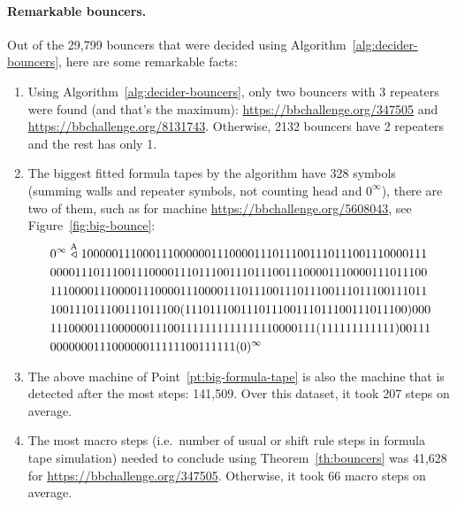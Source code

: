 \paragraph*{Remarkable bouncers.} Out of the 29,799 bouncers that were decided using Algorithm~\ref{alg:decider-bouncers}, here are some remarkable facts:
\begin{enumerate}
    \item Using Algorithm~\ref{alg:decider-bouncers}, only two bouncers with 3 repeaters were found (and that's the maximum): \url{https://bbchallenge.org/347505} and \url{https://bbchallenge.org/8131743}. Otherwise, 2132 bouncers have 2 repeaters and the rest has only 1.
    \item\label{pt:big-formula-tape} The biggest fitted formula tapes by the algorithm have 328 symbols (summing walls and repeater symbols, not counting head and $0^\infty$), there are two of them, such as for machine \url{https://bbchallenge.org/5608043}, see Figure~\ref{fig:big-bounce}:
          \begin{align*}
               & 0^\infty\stackrel{\text{A}}\triangleleft  10000011100011100000011100001110111001110111001110000111 \\ &0000111011100111000011101110011101110011100001110000111011100\\ &1110000111000011100001110000111011100111011100111011100111011\\ &100111011100111011100(111011100111011100111011100111011100)000\\ &1110000111000000111001111111111111110000111(111111111111)00111\\ &000000011100000011111100111111(0)^\infty
          \end{align*}

    \item The above machine of Point~\ref{pt:big-formula-tape} is also the machine that is detected after the most steps: 141,509. Over this dataset, it took 207 steps on average.
    \item The most macro steps (i.e.\ number of usual or shift rule steps in formula tape simulation) needed to conclude using Theorem~\ref{th:bouncers} was 41,628 for \url{https://bbchallenge.org/347505}. Otherwise, it took 66 macro steps on average.

\end{enumerate}
